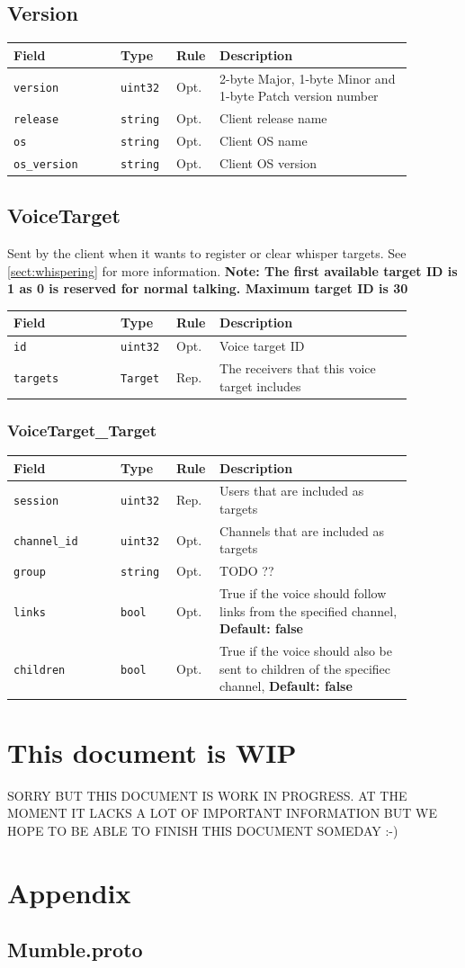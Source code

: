 \documentclass[11pt]{article} %
\newenvironment{mumbleMessageEx}
{%
	\small
	\renewcommand\arraystretch{1.5}
	\begin{tabular}{p{0.25\linewidth}p{0.13\linewidth}p{0.05\linewidth}p{0.45\linewidth}}
	Field & Type & Rule & Description \\
	\hline
}
{%
	\end{tabular}
	\renewcommand\arraystretch{1.0}
}
\newcommand{\mumbleMessageExItem}[4]{ \texttt{#1} & \texttt{#2} & #3 & #4 \\ }
\begin{document}
\subsection{Version}
\label{msg:version}

\begin{mumbleMessageEx}
\mumbleMessageExItem{version}{uint32}{Opt.}{2-byte Major, 1-byte Minor and 1-byte Patch version number}
\mumbleMessageExItem{release}{string}{Opt.}{Client release name}
\mumbleMessageExItem{os}{string}{Opt.}{Client OS name}
\mumbleMessageExItem{os\_version}{string}{Opt.}{Client OS version}
\end{mumbleMessageEx}

\subsection{VoiceTarget}
\label{msg:voiceTarget}

Sent by the client when it wants to register or clear whisper targets. See \ref{sect:whispering} for more information. \textbf{Note: The first available target ID is 1 as 0 is reserved for normal talking. Maximum target ID is 30}

\begin{mumbleMessageEx}
\mumbleMessageExItem{id}{uint32}{Opt.}{Voice target ID}
\mumbleMessageExItem{targets}{Target}{Rep.}{The receivers that this voice target includes}
\end{mumbleMessageEx}

\subsubsection{VoiceTarget\_Target}
\label{msg:voiceTarget:target}

\begin{mumbleMessageEx}
\mumbleMessageExItem{session}{uint32}{Rep.}{Users that are included as targets}
\mumbleMessageExItem{channel\_id}{uint32}{Opt.}{Channels that are included as targets}
\mumbleMessageExItem{group}{string}{Opt.}{TODO ??}
\mumbleMessageExItem{links}{bool}{Opt.}{True if the voice should follow links from the specified channel, \textbf{Default: false}}
\mumbleMessageExItem{children}{bool}{Opt.}{True if the voice should also be sent to children of the specifiec channel, \textbf{Default: false}}
\end{mumbleMessageEx}




\section*{This document is WIP}
SORRY BUT THIS DOCUMENT IS WORK IN PROGRESS. AT THE MOMENT IT LACKS A LOT OF IMPORTANT INFORMATION BUT WE HOPE TO BE ABLE TO FINISH THIS DOCUMENT SOMEDAY :-)

\appendix
\section{Appendix}
\subsection{Mumble.proto}
\label{appendix:mumble_proto}
\end{document}
